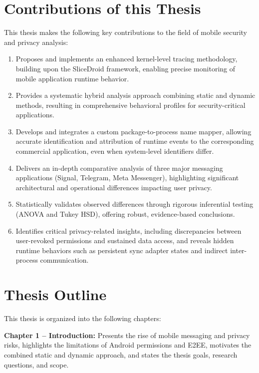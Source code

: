 \documentclass[a4paper,12pt]{report}
\begin{document}
\section{Contributions of this Thesis}

This thesis makes the following key contributions to the field of mobile security and privacy analysis:

\begin{enumerate}[label=\roman*.]
    \item Proposes and implements an enhanced kernel-level tracing methodology, building upon the SliceDroid framework, enabling precise monitoring of mobile application runtime behavior.
    \item Provides a systematic hybrid analysis approach combining static and dynamic methods, resulting in comprehensive behavioral profiles for security-critical applications.
    \item Develops and integrates a custom package-to-process name mapper, allowing accurate identification and attribution of runtime events to the corresponding commercial application, even when system-level identifiers differ.
    \item Delivers an in-depth comparative analysis of three major messaging applications (Signal, Telegram, Meta Messenger), highlighting significant architectural and operational differences impacting user privacy.
    \item Statistically validates observed differences through rigorous inferential testing (ANOVA and Tukey HSD), offering robust, evidence-based conclusions.
    \item Identifies critical privacy-related insights, including discrepancies between user-revoked permissions and sustained data access, and reveals hidden runtime behaviors such as persistent sync adapter states and indirect inter-process communication.
\end{enumerate}


\section{Thesis Outline}
This thesis is organized into the following chapters:

\textbf{Chapter 1 – Introduction:} Presents the rise of mobile messaging and privacy risks, highlights the limitations of Android permissions and E2EE, motivates the combined static and dynamic approach, and states the thesis goals, research questions, and scope.
\end{document}
